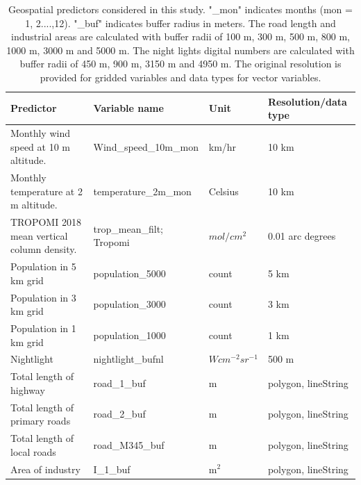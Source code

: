 \documentclass{article}
\begin{document}
 
\begin{table}[htb!] 
\centering
\caption{Geospatial predictors considered in this study. "\_mon" indicates months (mon = 1, 2....,12).  "\_buf" indicates buffer radius in meters. The road length and industrial areas are calculated with buffer radii of 100 m, 300 m, 500 m, 800 m, 1000 m, 3000 m and 5000 m. The night lights digital numbers are calculated with buffer radii of 450 m, 900 m, 3150 m and 4950 m. The original resolution is provided for gridded variables and data types for vector variables.}

\label{tab:prevar}
{
\begin{tabular}{p{4cm}|l|l|l}
\hline
Predictor                                    & Variable name                & Unit         & Resolution/data type         \\ \hline
Monthly wind speed at 10 m altitude. &  Wind\_speed\_10m\_mon   & km/hr         &    10 km \\ \hline
Monthly temperature at 2 m altitude.  & temperature\_2m\_mon  &  Celsius        &    10 km \\ \hline
 
TROPOMI 2018 mean vertical column density.  & trop\_mean\_filt; Tropomi&  $mol /cm^2$ &   0.01 arc degrees  \\ \hline

Population in 5 km grid  & population\_5000 & count  & 5 km \\ \hline
Population in 3 km grid & population\_3000 & count  & 3 km \\ \hline
Population in 1 km grid  & population\_1000 & count  & 1 km\\ \hline
Nightlight  & nightlight\_bufnl & $W cm^{-2} sr^{-1}$  & 500 m\\ \hline
Total length of highway  & road\_1\_buf  & m &polygon, lineString              \\\hline
Total length of primary roads                   & road\_2\_buf          & m  &polygon, lineString            \\\hline
Total length of local roads     & road\_M345\_buf        & m  &polygon, lineString               \\\hline
Area of industry                                    & I\_1\_buf           & m$^2$ &polygon, lineString            \\\hline
 
\end{tabular}
}  
\end{table}
\end{document}
